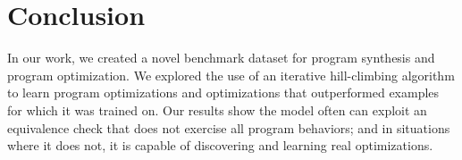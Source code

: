 \documentclass{article}
\begin{document}
\section{Conclusion}

In our work, we created a novel benchmark dataset for program synthesis and program optimization. We explored the use of an iterative hill-climbing algorithm to learn program optimizations and optimizations that outperformed examples for which it was trained on. Our results show the model often can exploit an equivalence check that does not exercise all program behaviors; and in situations where it does not, it is capable of discovering and learning real optimizations. 




\end{document}

